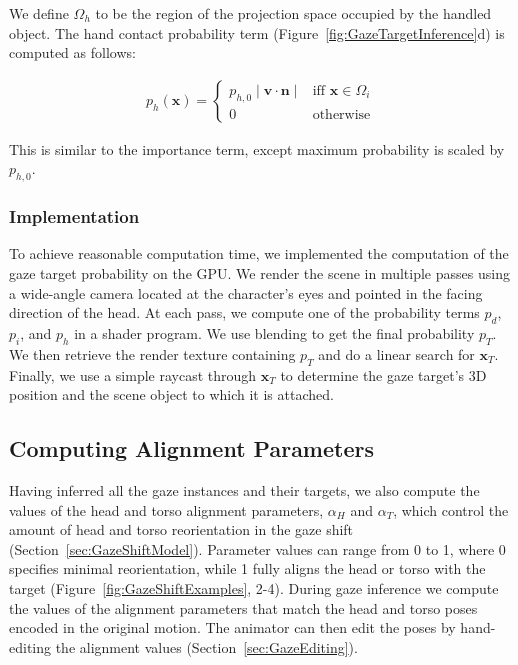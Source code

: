 We define $\Omega_h$ to be the region of the projection space occupied by the handled object. The hand contact probability term (Figure~\ref{fig:GazeTargetInference}d) is computed as follows:

\begin{align} \label{eq:GazeHandContactProbability}
p_h(\mathbf{x}) =
\begin{cases}
p_{h,0} \mid \mathbf{v} \cdot \mathbf{n} \mid & \text{iff } \mathbf{x} \in \Omega_i  \\
0 & \text{otherwise}
\end{cases}
\end{align}

This is similar to the importance term, except maximum probability is scaled by $p_{h,0}$.

\subsubsection{Implementation}

To achieve reasonable computation time, we implemented the computation of the gaze target probability on the GPU. We render the scene in multiple passes using a wide-angle camera located at the character's eyes and pointed in the facing direction of the head. At each pass, we compute one of the probability terms $p_d$, $p_i$, and $p_h$ in a shader program. We use blending to get the final probability $p_T$. We then retrieve the render texture containing $p_T$ and do a linear search for $\mathbf{x}_T$. Finally, we use a simple raycast through $\mathbf{x}_T$ to determine the gaze target's 3D position and the scene object to which it is attached.

\subsection{Computing Alignment Parameters}
\label{sec:GazeAlignmentInference}

Having inferred all the gaze instances and their targets, we also compute the values of the head and torso alignment parameters, $\alpha_{H}$ and $\alpha_{T}$, which control the amount of head and torso reorientation in the gaze shift (Section~\ref{sec:GazeShiftModel}). Parameter values can range from 0 to 1, where 0 specifies minimal reorientation, while 1 fully aligns the head or torso with the target (Figure~\ref{fig:GazeShiftExamples}, 2-4). During gaze inference we compute the values of the alignment parameters that match the head and torso poses encoded in the original motion. The animator can then edit the poses by hand-editing the alignment values (Section~\ref{sec:GazeEditing}).

